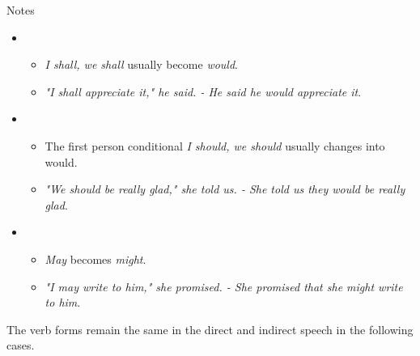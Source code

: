Notes

\begin{itemize} 

\item
\begin{itemize}
\item \textit{I shall, we shall} usually become \textit{would}.
\item \textit{"I shall appreciate it," he said. - He said he would appreciate it}.
\end{itemize}

\item
\begin{itemize}
\item The first person conditional \textit{I should, we should} usually changes into would. 
\item \textit{"We should be really glad," she told us. - She told us they would be really glad}.
\end{itemize}

\item
\begin{itemize}
\item \textit{May} becomes \textit{might}.
\item \textit{"I may write to him," she promised. - She promised that she might write to him}.
\end{itemize}

\end{itemize}

The verb forms remain the same in the direct and indirect speech in the following cases.

